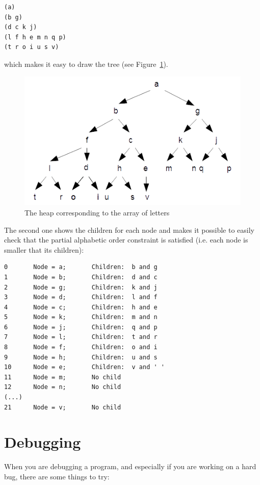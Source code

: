 \begin{verbatim}
(a)
(b g)
(d c k j)
(l f h e m n q p)
(t r o i u s v)
\end{verbatim}

which makes it easy to draw the tree (see Figure~\ref{fig.heap2}).

\begin{figure}
\centerline
{\includegraphics[scale=1]{figs/figure_heap2.png}}
\caption{The heap corresponding to the array of letters}
\label{fig.heap2}
\end{figure}


The second one shows the children for each node and makes it 
possible to easily check that the partial alphabetic order 
constraint is satisfied (i.e. each node is smaller that its 
children):

\begin{verbatim}
0       Node = a;       Children:  b and g
1       Node = b;       Children:  d and c
2       Node = g;       Children:  k and j
3       Node = d;       Children:  l and f
4       Node = c;       Children:  h and e
5       Node = k;       Children:  m and n
6       Node = j;       Children:  q and p
7       Node = l;       Children:  t and r
8       Node = f;       Children:  o and i
9       Node = h;       Children:  u and s
10      Node = e;       Children:  v and ' '
11      Node = m;       No child
12      Node = n;       No child
(...)
21      Node = v;       No child
\end{verbatim}



\section{Debugging}

When you are debugging a program, and especially if you are
working on a hard bug, there are some things to try:

